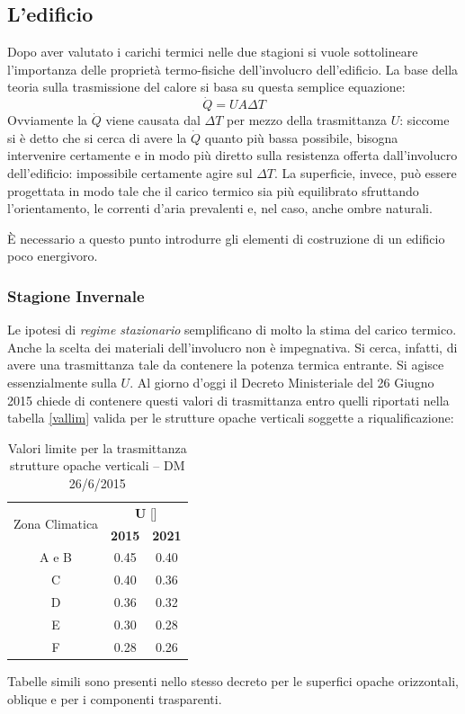 \subsection{L'edificio}
Dopo aver valutato i carichi termici nelle due stagioni si vuole sottolineare l'importanza delle proprietà termo-fisiche dell'involucro dell'edificio.
La base della teoria sulla trasmissione del calore si basa su questa semplice equazione:
\begin{equation}
	\dot{Q}=UA\Delta T
\end{equation}
Ovviamente la $\dot{Q}$ viene causata dal $\Delta T$ per mezzo della trasmittanza $U$: siccome si è detto che si cerca di avere la $\dot{Q}$ quanto più bassa possibile, bisogna intervenire certamente e in modo più diretto sulla resistenza offerta dall'involucro dell'edificio: impossibile certamente agire sul $\Delta T$. La superficie, invece, può essere progettata in modo tale che il carico termico sia più equilibrato sfruttando l'orientamento, le correnti d'aria prevalenti e, nel caso, anche ombre naturali.

È necessario a questo punto introdurre gli elementi di costruzione di un edificio poco energivoro.

\subsubsection{Stagione Invernale}
Le ipotesi di \emph{regime stazionario} semplificano di molto la stima del carico termico. Anche la scelta dei materiali dell'involucro non è impegnativa. Si cerca, infatti, di avere una trasmittanza tale da contenere la potenza termica entrante. Si agisce essenzialmente sulla $U$. Al giorno d'oggi il Decreto Ministeriale del 26 Giugno 2015 chiede di contenere questi valori di trasmittanza entro quelli riportati nella tabella \vref{vallim} valida per le strutture opache verticali soggette a riqualificazione:
\begin{table}
	\centering
	\begin{tabular}{ccc}
		\multirow{2}{*}{Zona Climatica} & \multicolumn{2}{c}{\textbf{U} [\trasm]}	\\
		\cmidrule(lr){2-3}
										& \textbf{2015} & \textbf{2021}				\\
		\midrule
		A e B							&	0.45		&	0.40 					\\
		C								& 	0.40		&	0.36					\\
		D								&	0.36		&	0.32					\\
		E								&	0.30		&	0.28					\\
		F								&	0.28		&	0.26					\\
	\end{tabular}
	\caption{Valori limite per la trasmittanza\\strutture opache verticali -- DM 26/6/2015}\label{vallim:opve}
\end{table}
Tabelle simili sono presenti nello stesso decreto per le superfici opache orizzontali, oblique e per i componenti trasparenti.

